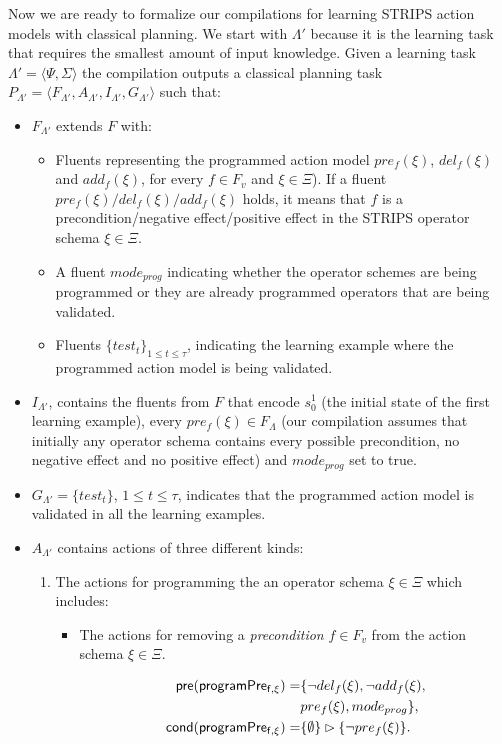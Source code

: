 \documentclass[letterpaper]{article} %
\newcommand{\tup}[1]{{\langle #1 \rangle}}
\newcommand{\pre}{\mathsf{pre}}     %
\newcommand{\cond}{\mathsf{cond}}   %
\begin{document}
Now we are ready to formalize our compilations for learning STRIPS action models with classical planning. We start with $\Lambda'$ because it is the learning task that requires the smallest amount of input knowledge. Given a learning task $\Lambda'=\tup{\Psi,\Sigma}$ the compilation outputs a classical planning task $P_{\Lambda'}=\tup{F_{\Lambda'},A_{\Lambda'},I_{\Lambda'},G_{\Lambda'}}$ such that:
\begin{itemize}
\item $F_{\Lambda'}$ extends $F$ with:
\begin{itemize}
\item Fluents representing the programmed action model $pre_f(\xi)$, $del_f(\xi)$ and $add_f(\xi)$, for every $f\in F_v$ and $\xi \in \Xi$). If a fluent $pre_f(\xi)/del_f(\xi)/add_f(\xi)$ holds, it means that $f$ is a precondition/negative effect/positive effect in the STRIPS operator schema $\xi\in \Xi$. 
\item A fluent $mode_{prog}$ indicating whether the operator schemes are being programmed or they are already programmed operators that are being validated. 
\item Fluents $\{test_t\}_{1\leq t\leq \tau}$, indicating the learning example where the programmed action model is being validated.
\end{itemize}
\item $I_{\Lambda'}$, contains the fluents from $F$ that encode $s_0^1$ (the initial state of the first learning example), every $pre_f(\xi)\in F_{\Lambda}$ (our compilation assumes that initially any operator schema contains every possible precondition, no negative effect and no positive effect) and $mode_{prog}$ set to true. 
\item $G_{\Lambda'}=\{test_t\}$, {\small $1\leq t\leq \tau$}, indicates that the programmed action model is validated in all the learning examples.
\item $A_{\Lambda'}$ contains actions of three different kinds:
\begin{enumerate}
\item The actions for programming the an operator schema $\xi\in\Xi$ which includes:
\begin{itemize}
\item The actions for removing a {\em precondition} $f\in F_v$ from the action schema $\xi\in\Xi$. 

\begin{small}
\begin{align*}
\hspace*{7pt}\pre(\mathsf{programPre_{f,\xi}})=&\{\neg del_{f}(\xi),\neg add_{f}(\xi),\\
& pre_{f}(\xi), mode_{prog}\},\\    
\cond(\mathsf{programPre_{f,\xi}})=&\{\emptyset\}\rhd\{\neg pre_{f}(\xi)\}.
\end{align*}
\end{small}


\end{itemize}
\end{enumerate}
\end{itemize}
\end{document}
